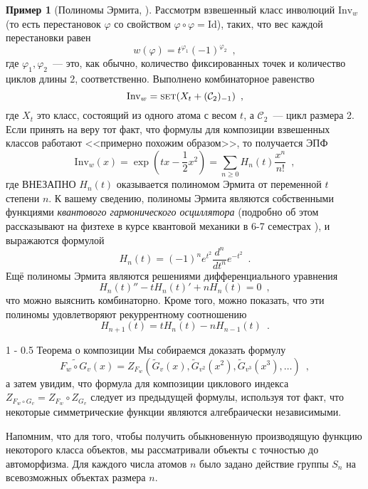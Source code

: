 \documentclass{article}
\makeatletter
\theoremstyle{definition}
\newtheorem{example}{Пример}
\renewcommand{\section}{\@startsection
{section}%
{1}%
{\z@}%
{-\baselineskip}%
{0.5\baselineskip}%
{\centering\large\scshape}} %
\makeatother
\begin{document}
\begin{example}[Полиномы Эрмита, {\cite[Example 16, page 89]{species}}]
    Рассмотрм взвешенный класс инволюций \( \mathrm{Inv}_w \) (то есть
перестановок \( \varphi \) со свойством \( \varphi \circ \varphi = \mathrm{Id}
\)), таких, что вес каждой перестановки равен
\[
    w(\varphi) = t^{\varphi_1} (-1)^{\varphi_2} \enspace ,
\]
где \( \varphi_1, \varphi_2 \)~--- это, как обычно, количество фиксированных
точек и количество циклов длины \( 2 \), соответственно. Выполнено комбинаторное
равенство
\[
    \mathrm{Inv}_w = \text{\textsc{set}}(X_t + (\mathcal C_2)_{-1}) \enspace ,
\]
где \( X_t \) это класс, состоящий из одного атома с весом \( t \), а \(
\mathcal C_2 \)~--- цикл размера 2. Если принять на веру тот факт, что формулы
для композиции взвешенных классов работают <<примерно похожим образом>>, то
получается ЭПФ
\[
    \mathrm{Inv}_w(x) = \exp \left(
        tx - \dfrac12 x^2
    \right) = \sum_{n \geq 0} H_n(t) \dfrac{x^n}{n!} \enspace ,
\]
где ВНЕЗАПНО \( H_n(t) \) оказывается полиномом Эрмита от переменной \( t \)
степени \( n \). К вашему сведению, полиномы Эрмита являются собственными
функциями \textit{квантового гармонического осциллятора} (подробно об этом
рассказывают на физтехе в курсе квантовой механики в 6-7 семестрах
\cite[section 4.1]{mipt-quantum}), и выражаются
формулой
\[  
    H_n(t) = (-1)^n e^{t^2} \dfrac{d^n}{dt^n} e^{-t^2}
    \enspace .
\]
Ещё полиномы Эрмита являются решениями дифференциального уравнения
\[
    H_n(t)'' - t H_n(t)' + n H_n(t) = 0 \enspace ,
\]
что можно выяснить комбинаторно. Кроме того, можно показать, что эти полиномы
удовлетворяют рекуррентному соотношению
\[
    H_{n+1} (t) = t H_n(t) - n H_{n-1}(t) \enspace .
\]
\end{example}

\section{Теорема о композиции}
    Мы собираемся доказать формулу
\[
    \widetilde{F_w \circ G_v} (x) = Z_{F_w} (\widetilde G_v(x), \widetilde
G_{v^2}(x^2) ,
\widetilde G_{v^3}(x^3), \ldots ) \enspace ,
\]
а затем увидим, что формула для композиции циклового индекса \( Z_{F_{w} \circ
G_{v}} =
Z_{F_w} \circ Z_{G_v} \) следует из предыдущей формулы, используя тот факт, что
некоторые симметрические функции являются алгебраически независимыми.

Напомним, что для того, чтобы получить обыкновенную производящую функцию
некоторого класса объектов, мы рассматривали объекты с точностью до
автоморфизма. Для каждого числа атомов \( n \) было задано действие группы \(
S_n \) на всевозможных объектах размера \( n
\).
\end{document}
